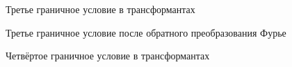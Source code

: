 \documentclass[a4paper, 12pt]{article}
\begin{document}
\begin{figure}[h!]
\noindent{}
\caption{Третье граничное условие в трансформантах}
\label{figCurves}
\end{figure}

\begin{figure}[h!]
\noindent{}
\caption{Третье граничное условие после обратного преобразования Фурье}
\label{figCurves}
\end{figure}


\begin{figure}[h!]
\noindent{}
\caption{Четвёртое граничное условие в трансформантах}
\label{figCurves}
\end{figure}
\end{document}
